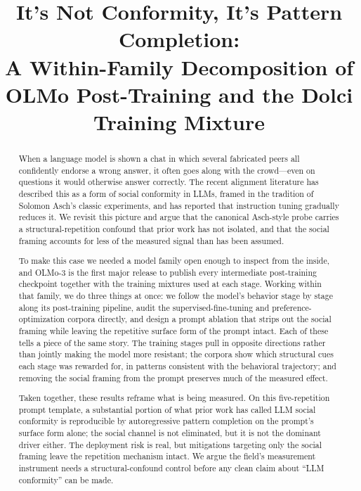\documentclass{article}
\title{It's Not Conformity, It's Pattern Completion:\\ A Within-Family Decomposition of OLMo Post-Training and the Dolci Training Mixture}
\begin{document}
\maketitle

\begin{abstract}
When a language model is shown a chat in which several fabricated peers all confidently endorse a wrong answer, it often goes along with the crowd---even on questions it would otherwise answer correctly. The recent alignment literature has described this as a form of social conformity in LLMs, framed in the tradition of Solomon Asch's classic experiments, and has reported that instruction tuning gradually reduces it. We revisit this picture and argue that the canonical Asch-style probe carries a structural-repetition confound that prior work has not isolated, and that the social framing accounts for less of the measured signal than has been assumed.

To make this case we needed a model family open enough to inspect from the inside, and OLMo-3 is the first major release to publish every intermediate post-training checkpoint together with the training mixtures used at each stage. Working within that family, we do three things at once: we follow the model's behavior stage by stage along its post-training pipeline, audit the supervised-fine-tuning and preference-optimization corpora directly, and design a prompt ablation that strips out the social framing while leaving the repetitive surface form of the prompt intact. Each of these tells a piece of the same story. The training stages pull in opposite directions rather than jointly making the model more resistant; the corpora show which structural cues each stage was rewarded for, in patterns consistent with the behavioral trajectory; and removing the social framing from the prompt preserves much of the measured effect.

Taken together, these results reframe what is being measured. On this five-repetition prompt template, a substantial portion of what prior work has called LLM social conformity is reproducible by autoregressive pattern completion on the prompt's surface form alone; the social channel is not eliminated, but it is not the dominant driver either. The deployment risk is real, but mitigations targeting only the social framing leave the repetition mechanism intact. We argue the field's measurement instrument needs a structural-confound control before any clean claim about ``LLM conformity'' can be made.
\end{abstract}
\end{document}
